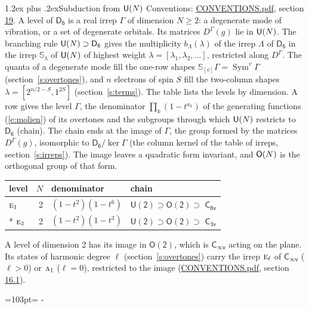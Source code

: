 \documentclass[10pt,a4paper]{article}
\makeatletter
\renewcommand\section{\@startsection{section}{1}{\z@}{-3ex plus -1ex minus -.2ex}%
  {1.2ex plus .2ex}{\normalfont\large\sffamily\bfseries\color{parttitle}}}
\newcommand{\needspace}[1]{\par\penalty-100\begingroup\dimen0=#1\relax\dimen2=\pagegoal
  \advance\dimen2-\pagetotal\ifdim\dimen0>\dimen2\relax\ifdim\dimen2>0pt\vfil\break\fi\fi
  \endgroup}
\numberwithin{equation}{section}
\newcommand{\grp}[1]{\mathsf{#1}}
\newcommand{\irr}[1]{\text{\normalfont\scshape #1}}
\newcommand{\repD}[1]{D^{#1}}
\newcommand{\schur}[1]{\mathbb{S}_{#1}}
\newcommand{\shape}[1]{[#1]}
\makeatother
\begin{document}
\section{Subduction from \texorpdfstring{$\grp{U(\mathnormal{N})}$}{U(N)}}\label{s:unitary}
Conventions: \href{../../CONVENTIONS.pdf}{CONVENTIONS.pdf}, section \href{../../CONVENTIONS.pdf\#conv.19}{19}.
\leavevmode\label{n:local.level.dimension}A level of $\grp{D_{6}}$ is a real irrep $\Gamma$ of dimension $N \ge 2$: a degenerate mode of vibration, or a set of degenerate orbitals. \label{n:group.unitary}Its matrices $\repD{\Gamma}(g)$ lie in $\grp{U(\mathnormal{N})}$. \label{n:irrep.schur}\label{n:shape.partition}\label{n:local.partition}\label{n:function.multiplicity.unitary}The branching rule $\grp{U(\mathnormal{N})} \supset \grp{D_{6}}$ gives the multiplicity $b_\Lambda(\lambda)$ of the irrep $\Lambda$ of $\grp{D_{6}}$ in the irrep $\schur{\lambda}$ of $\grp{U(\mathnormal{N})}$ of highest weight $\lambda = \shape{\lambda_1, \lambda_2, \dots}$, restricted along $\repD{\Gamma}$. \label{n:local.partition.power}\label{n:local.electrons}\label{n:local.spin}The quanta of a degenerate mode fill the one-row shapes $\schur{\shape{v}}\Gamma = \operatorname{Sym}^{v}\Gamma$ (section~\ref{s:overtones}), and $n$ electrons of spin $S$ fill the two-column shapes $\lambda = \shape{2^{n/2-S}, 1^{2S}}$ (section~\ref{s:terms}).
The table lists the levels by dimension. \label{n:head.level}\label{n:head.denominator}\label{n:index.overtone.denominator}\label{n:head.chain}A row gives the level $\Gamma$, the denominator $\prod_k (1 - t^{a_k})$ of the generating functions (\ref{e:molien}) of its overtones and the subgroups through which $\grp{U(\mathnormal{N})}$ restricts to $\grp{D_{6}}$ (chain). The chain ends at the image of $\Gamma$, the group formed by the matrices $\repD{\Gamma}(g)$, isomorphic to $\grp{D_{6}}/\ker\Gamma$ (the column kernel of the table of irreps, section~\ref{s:irreps}). The image leaves a quadratic form invariant, and $\grp{O(\mathnormal{N})}$ is the orthogonal group of that form.
{\small\begin{longtable}{@{}lrll@{}}\toprule
level & $N$ & denominator & chain\\\midrule\endhead
\bottomrule\endfoot\endlastfoot
$\irr{e}_{1}$ & 2 & $(1-t^{2})(1-t^{6})$ & $\grp{U(2)} \supset \grp{O(2)} \supset$ \href{C6v.pdf}{$\grp{C_{6v}}$}\\*
$\irr{e}_{2}$ & 2 & $(1-t^{2})(1-t^{3})$ & $\grp{U(2)} \supset \grp{O(2)} \supset$ \href{C3v.pdf}{$\grp{C_{3v}}$}\\
\bottomrule\end{longtable}}
A level of dimension 2 has its image in $\grp{O(2)}$, which is \href{Cinfv.pdf}{$\grp{C_{\infty v}}$} acting on the plane. \label{n:index.harmonic.degree}Its states of harmonic degree $\ell$ (section~\ref{s:overtones}) carry the irrep $\irr{e}_{\ell}$ of \href{Cinfv.pdf}{$\grp{C_{\infty v}}$} ($\ell > 0$) or $\irr{a}_{1}$ ($\ell = 0$), restricted to the image (\href{../../CONVENTIONS.pdf}{CONVENTIONS.pdf}, section \href{../../CONVENTIONS.pdf\#conv.16.1}{16.1}).
\needspace{103pt}
\end{document}
